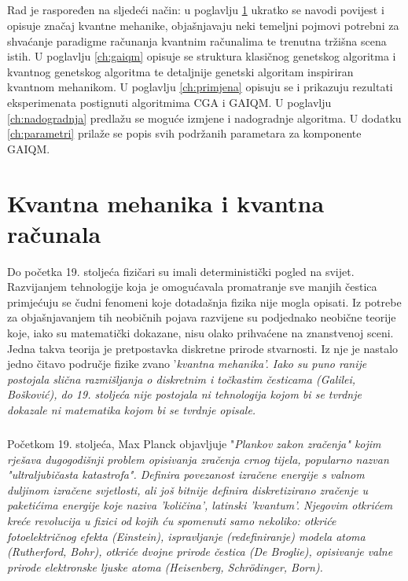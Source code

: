 \documentclass[times, utf8, zavrsni, numeric]{fer}
\begin{document}
\paragraph{}
Rad je raspoređen na sljedeći način: u poglavlju \ref{ch:kvameh} ukratko se navodi povijest i opisuje značaj kvantne mehanike, objašnjavaju neki temeljni pojmovi potrebni za shvaćanje paradigme računanja kvantnim računalima te trenutna tržišna scena istih. U poglavlju \ref{ch:gaiqm} opisuje se struktura klasičnog genetskog algoritma i kvantnog genetskog algoritma te detaljnije genetski algoritam inspiriran kvantnom mehanikom. U poglavlju \ref{ch:primjena} opisuju se i prikazuju rezultati eksperimenata postignuti algoritmima CGA i GAIQM. 
U poglavlju \ref{ch:nadogradnja} predlažu se moguće izmjene i nadogradnje algoritma. U dodatku \ref{ch:parametri} prilaže se popis svih podržanih parametara za komponente GAIQM.

\chapter{Kvantna mehanika i kvantna računala}
\label{ch:kvameh}
Do početka 19. stoljeća fizičari su imali deterministički pogled na svijet. Razvijanjem tehnologije koja je omogućavala promatranje sve manjih čestica primjećuju se čudni fenomeni koje dotadašnja fizika nije mogla opisati. Iz potrebe za objašnjavanjem tih neobičnih pojava razvijene su podjednako neobične teorije koje, iako su matematički dokazane, nisu olako prihvaćene na znanstvenoj sceni. Jedna takva teorija je pretpostavka diskretne prirode stvarnosti. Iz nje je nastalo jedno čitavo područje fizike zvano '\it kvantna mehanika\rm '. Iako su puno ranije postojala slična razmišljanja o diskretnim i točkastim česticama (Galilei, Bošković), do 19. stoljeća nije postojala ni tehnologija kojom bi se tvrdnje dokazale ni matematika kojom bi se tvrdnje opisale.

\paragraph{}
Početkom 19. stoljeća, Max Planck objavljuje "\it Plankov zakon zračenja\rm" kojim rješava dugogodišnji problem opisivanja zračenja crnog tijela, popularno nazvan "\it ultraljubičasta katastrofa\rm". Definira povezanost izračene energije s valnom duljinom izračene svjetlosti, ali još bitnije definira diskretizirano zračenje u paketićima energije koje naziva 'količina', latinski 'kvantum'. Njegovim otkrićem kreće revolucija u fizici od kojih ću spomenuti samo nekoliko: otkriće fotoelektričnog efekta (Einstein), ispravljanje (redefiniranje) modela atoma (Rutherford, Bohr), otkriće dvojne prirode čestica (De Broglie), opisivanje valne prirode elektronske ljuske atoma (Heisenberg, Schr\"odinger, Born). \citep{bozja_cestica}
\end{document}
